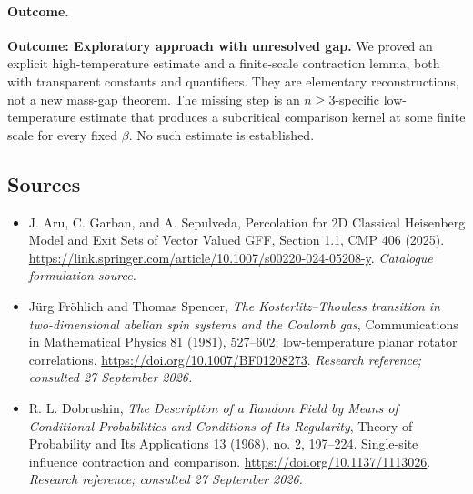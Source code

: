 \documentclass[11pt,a4paper]{article}
\numberwithin{equation}{section}
\begin{document}
\paragraph{Outcome.}
\textbf{Outcome: Exploratory approach with unresolved gap.}
We proved an explicit high-temperature estimate and a finite-scale contraction lemma, both with transparent constants and quantifiers. They are elementary reconstructions, not a new mass-gap theorem. The missing step is an $n\ge3$-specific low-temperature estimate that produces a subcritical comparison kernel at some finite scale for every fixed $\beta$. No such estimate is established.

\subsection{Sources}
\begin{itemize}\raggedright
\item[\textnormal{[S1]}]\hypertarget{source:30006780:1}{} J. Aru, C. Garban, and A. Sepulveda, Percolation for 2D Classical Heisenberg Model and Exit Sets of Vector Valued GFF, Section 1.1, CMP 406 (2025).
\url{https://link.springer.com/article/10.1007/s00220-024-05208-y}.
{\small\textit{Catalogue formulation source.}}
\item[\textnormal{[E1]}]\hypertarget{extra:30006780:1}{} J\"urg Fr\"ohlich and Thomas Spencer, \emph{The Kosterlitz--Thouless transition in two-dimensional abelian spin systems and the Coulomb gas}, Communications in Mathematical Physics 81 (1981), 527--602; low-temperature planar rotator correlations.
\url{https://doi.org/10.1007/BF01208273}.
{\small\textit{Research reference; consulted 27 September 2026.}}
\item[\textnormal{[E2]}]\hypertarget{extra:30006780:2}{} R. L. Dobrushin, \emph{The Description of a Random Field by Means of Conditional Probabilities and Conditions of Its Regularity}, Theory of Probability and Its Applications 13 (1968), no. 2, 197--224. Single-site influence contraction and comparison.
\url{https://doi.org/10.1137/1113026}.
{\small\textit{Research reference; consulted 27 September 2026.}}
\end{itemize}
\end{document}
